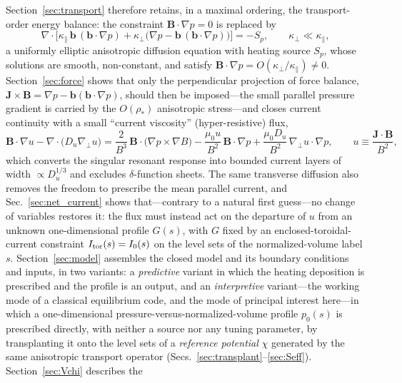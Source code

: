 \documentclass[english]{article}
\newcommand{\bB}{\mathbf{B}}
\newcommand{\bJ}{\mathbf{J}}
\newcommand{\bb}{\mathbf{b}}
\newcommand{\gradperp}{\nabla_{\!\perp}}
\begin{document}
Section~\ref{sec:transport} therefore retains, in a maximal ordering, the transport-order energy
balance: the constraint $\bB\cdot\nabla p=0$ is replaced by
\begin{equation}
\nabla\cdot\Big[\kappa_\parallel\,\bb\,(\bb\cdot\nabla p)
+\kappa_\perp\big(\nabla p-\bb\,(\bb\cdot\nabla p)\big)\Big]=-S_p,
\qquad \kappa_\perp\ll\kappa_\parallel ,
\label{eq:p_preview}
\end{equation}
a uniformly elliptic anisotropic diffusion equation with heating source $S_p$, whose solutions are
smooth, non-constant, and satisfy $\bB\cdot\nabla p=O(\kappa_\perp/\kappa_\parallel)\ne0$.
Section~\ref{sec:force} shows that only the perpendicular projection of force balance,
$\bJ\times\bB=\nabla p-\bb(\bb\cdot\nabla p)$, should then be imposed---the small parallel pressure
gradient is carried by the $O(\rho_*)$ anisotropic stress---and closes current continuity with a
small ``current viscosity'' (hyper-resistive) flux,
\begin{equation}
\bB\cdot\nabla u-\nabla\cdot\big(D_u\gradperp u\big)
=\frac{2}{B^{3}}\,\bB\cdot\big(\nabla p\times\nabla B\big)
-\frac{\mu_0 u}{B^{2}}\,\bB\cdot\nabla p
+\frac{\mu_0 D_u}{B^{2}}\,\gradperp u\cdot\nabla p ,
\qquad u\equiv\frac{\bJ\cdot\bB}{B^{2}},
\label{eq:u_preview}
\end{equation}
which converts the singular resonant response into bounded current layers of width
$\propto D_u^{1/3}$ and excludes $\delta$-function sheets. The same transverse diffusion also
removes the freedom to prescribe the mean parallel current, and Sec.~\ref{sec:net_current} shows
that---contrary to a natural first guess---no change of variables restores it: the flux must
instead act on the departure of $u$ from an unknown one-dimensional profile $G(s)$, with $G$ fixed
by an enclosed-toroidal-current constraint $I_{\rm tor}(s)=I_0(s)$ on the level sets of the
normalized-volume label $s$. Section~\ref{sec:model} assembles the
closed model and its boundary conditions and inputs, in two variants: a \emph{predictive} variant
in which the heating deposition is prescribed and the profile is an output, and an
\emph{interpretive} variant---the working mode of a classical equilibrium code, and the mode of
principal interest here---in which a one-dimensional pressure-versus-normalized-volume profile
$p_0(s)$ is
prescribed directly, with neither a source nor any tuning parameter, by transplanting it onto the
level sets of a \emph{reference potential} $\chi$ generated by the same anisotropic transport
operator (Secs.~\ref{sec:transplant}--\ref{sec:Seff}). Section~\ref{sec:Vchi} describes the
\end{document}
